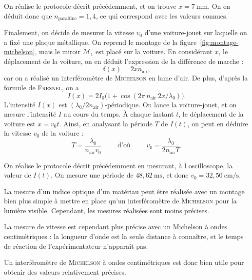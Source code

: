 \documentclass[a4paper,twocolumn,10pt,margin=0.5in]{extreport}
\def\res#1{{\color{cyan}#1}}
\begin{document}
	On réalise le protocole décrit précédemment, et on trouve \res{$x = 7\:\mathrm{mm}$}. On en déduit donc que \res{$n_\mathrm{paraffine} = 1{,}4$}, ce qui correspond avec les valeurs connues.

	Finalement, on décide de mesurer la vitesse $v_0$ d'une voiture-jouet sur laquelle on a fixé une plaque métallique.
	On reprend le montage de la figure~\ref{fig:montage-michelson}, mais le miroir $\mathcal{M}_1$ est placé sur la voiture.
	En considérant $x$, le déplacement de la voiture, on en déduit l'expression de la différence de marche : \[
		\delta(x) = 2x n_\mathrm{air} 
	,\] car on a réalisé un interféromètre de \textsc{Michelson} en lame d'air.
	De plus, d'après la formule de \textsc{Fresnel}, on a \[
		I(x) = 2I_0\big(1 + \cos(2\pi\,n_\mathrm{air}\:2x / \lambda_0)\big)
	.\]
	L'intensité $I(x)$ est $(\lambda_0 / 2n_\mathrm{air})$-périodique.
	On lance la voiture-jouet, et on mesure l'intensité $I$ au cours du temps.
	À chaque instant $t$, le déplacement de la voiture est $x = v_0 t$.
	Ainsi, en analysant la période $T$ de $I(t)$, on peut en déduire la vitesse $v_0$ de la voiture : \[
		T = \frac{\lambda_0}{n_\mathrm{air}v_0} \quad\quad\text{ d'où }\quad\quad v_0 = \frac{\lambda_0}{2n_\mathrm{air}  T}
	.\]

	On réalise le protocole décrit précédemment en mesurant, à l oscilloscope, la valeur de $I(t)$.
	On mesure une période de \res{$48{,}62\:\mathrm{ms}$}, et donc \res{$v_0 = 32{,}50\:\mathrm{cm}/\mathrm{s}$}.

	\centerline{}

	La mesure d'un indice optique d'un matériau peut être réalisée avec un montage bien plus simple à mettre en place qu'un interféromètre de \textsc{Michelson} pour la lumière visible.
	Cependant, les mesures réalisées sont moins précises.
	
	La mesure de vitesse est cependant plus précise avec un Michelson à ondes centimétriques : la longueur d'onde est la seule distance à connaître, et le temps de réaction de l'expérimentateur n'apparaît pas.

	Un interféromètre de \textsc{Michelson} à ondes centimétriques est donc bien utile pour obtenir des valeurs relativement précises.


	\sign

	~
\end{document}

